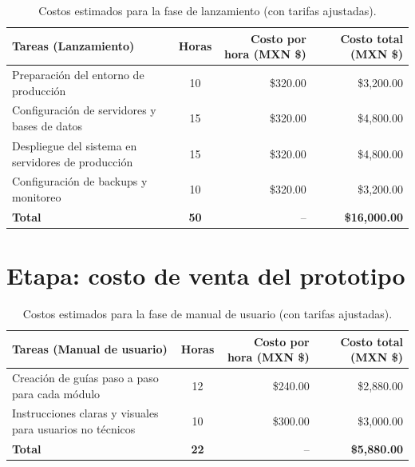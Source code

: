 \begin{table}[H]
	\centering
	\renewcommand{\arraystretch}{1.6}
	\setlength{\tabcolsep}{10pt}
	\Huge
	\begin{adjustbox}{max width=\textwidth}
		\begin{tabular}{|p{9.5cm}|c|r|r|}
			\hline
			\textbf{Tareas (Lanzamiento)} & \textbf{Horas} & \textbf{Costo por hora (MXN \$)} & \textbf{Costo total (MXN \$)} \\ \hline
			Preparación del entorno de producción & 10 & \$320.00 & \$3,200.00 \\ \hline
			Configuración de servidores y bases de datos & 15 & \$320.00 & \$4,800.00 \\ \hline
			Despliegue del sistema en servidores de producción & 15 & \$320.00 & \$4,800.00 \\ \hline
			Configuración de backups y monitoreo & 10 & \$320.00 & \$3,200.00 \\ \hline
			\textbf{Total} & \textbf{50} & -- & \textbf{\$16,000.00} \\ \hline
		\end{tabular}
	\end{adjustbox}
	\caption{Costos estimados para la fase de lanzamiento (con tarifas ajustadas).}
	\label{tab:costos_lanzamiento_actualizado}
\end{table}

\section{Etapa: costo de venta del prototipo}

\begin{table}[H]
	\centering
	\renewcommand{\arraystretch}{1.6}
	\setlength{\tabcolsep}{10pt}
	\Huge
	\begin{adjustbox}{max width=\textwidth}
		\begin{tabular}{|p{9.5cm}|c|r|r|}
			\hline
			\textbf{Tareas (Manual de usuario)} & \textbf{Horas} & \textbf{Costo por hora (MXN \$)} & \textbf{Costo total (MXN \$)} \\ \hline
			Creación de guías paso a paso para cada módulo & 12 & \$240.00 & \$2,880.00 \\ \hline
			Instrucciones claras y visuales para usuarios no técnicos & 10 & \$300.00 & \$3,000.00 \\ \hline
			\textbf{Total} & \textbf{22} & -- & \textbf{\$5,880.00} \\ \hline
		\end{tabular}
	\end{adjustbox}
	\caption{Costos estimados para la fase de manual de usuario (con tarifas ajustadas).}
	\label{tab:costos_manual_usuario_actualizado}
\end{table}

